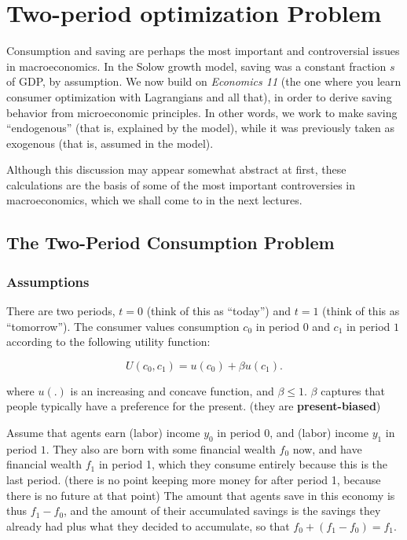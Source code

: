 \documentclass[]{book}
\theoremstyle{definition}
\theoremstyle{definition}
\theoremstyle{definition}
\theoremstyle{remark}
\begin{document}
\hypertarget{two-period}{\chapter{Two-period optimization
Problem}\label{two-period}}

Consumption and saving are perhaps the most important and controversial
issues in macroeconomics. In the Solow growth model, saving was a
constant fraction \(s\) of GDP, by assumption. We now build on
\emph{Economics 11} (the one where you learn consumer optimization with
Lagrangians and all that), in order to derive saving behavior from
microeconomic principles. In other words, we work to make saving
``endogenous'' (that is, explained by the model), while it was
previously taken as exogenous (that is, assumed in the model).

Although this discussion may appear somewhat abstract at first, these
calculations are the basis of some of the most important controversies
in macroeconomics, which we shall come to in the next lectures.

\section{The Two-Period Consumption
Problem}\label{the-two-period-consumption-problem}

\subsection{Assumptions}\label{assumptions-1}

There are two periods, \(t=0\) (think of this as ``today'') and \(t=1\)
(think of this as ``tomorrow''). The consumer values consumption \(c_0\)
in period \(0\) and \(c_1\) in period \(1\) according to the following
utility function:

\[U(c_{0},c_{1})=u(c_{0})+\beta u(c_{1}).\]

where \(u(.)\) is an increasing and concave function, and
\(\beta \leq 1\). \(\beta\) captures that people typically have a
preference for the present. (they are \textbf{present-biased})

Assume that agents earn (labor) income \(y_{0}\) in period \(0\), and
(labor) income \(y_{1}\) in period \(1\). They also are born with some
financial wealth \(f_{0}\) now, and have financial wealth \(f_{1}\) in
period 1, which they consume entirely because this is the last period.
(there is no point keeping more money for after period 1, because there
is no future at that point) The amount that agents save in this economy
is thus \(f_{1}-f_{0}\), and the amount of their accumulated savings is
the savings they already had plus what they decided to accumulate, so
that \(f_{0}+(f_{1}-f_{0})=f_{1}.\)
\end{document}
